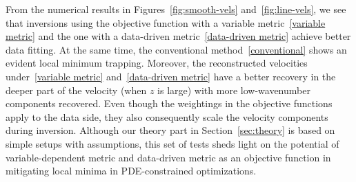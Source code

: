 \documentclass[12pt]{amsart}
\begin{document}
From the numerical results in Figures~\ref{fig:smooth-vels} and~\ref{fig:line-vels}, we see that inversions using the objective function with a variable metric~\eqref{variable metric} and the one with a data-driven metric~\eqref{data-driven metric} achieve better data fitting. At the same time, the conventional method~\eqref{conventional} shows an evident local minimum trapping. Moreover, the reconstructed velocities under~\eqref{variable metric} and~\eqref{data-driven metric} have a better recovery in the deeper part of the velocity (when $z$ is large) with more low-wavenumber components recovered. Even though the weightings in the objective functions apply to the data side, they also consequently scale the velocity components during inversion. Although our theory part in Section~\ref{sec:theory} is based on simple setups with assumptions, this set of tests sheds light on the potential of variable-dependent metric and data-driven metric as an objective function in mitigating local minima in PDE-constrained optimizations.
\end{document}
